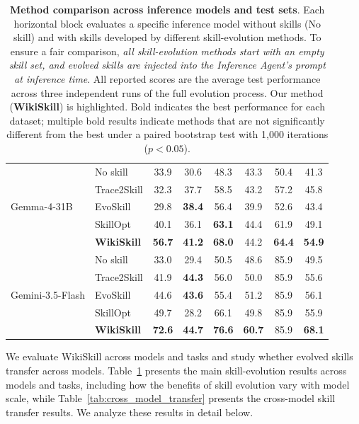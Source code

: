 \documentclass[11pt, a4paper, copyright, gr]{google}
\newcommand{\methodcolor}[1]{\cellcolor[HTML]{FDE293}#1}
\newcommand{\method}{WikiSkill\xspace}
\begin{document}
\begin{table}[t]
\begin{tabular}{llccccc|c}
\midrule
\multirow{5}{*}{Gemma-4-31B} & No skill & 33.9 & 30.6 & 48.3 & 43.3 & 50.4 & 41.3 \\
 & Trace2Skill & 32.3 & 37.7 & 58.5 & 43.2 & 57.2 & 45.8 \\
 & EvoSkill & 29.8 & \textbf{38.4} & 56.4 & 39.9 & 52.6 & 43.4 \\
 & SkillOpt & 40.1 & 36.1 & \textbf{63.1} & 44.4 & 61.9 & 49.1 \\
 & \methodcolor{\textbf{WikiSkill}} & \methodcolor{\textbf{56.7}} & \methodcolor{\textbf{41.2}} & \methodcolor{\textbf{68.0}} & \methodcolor{44.2} & \methodcolor{\textbf{64.4}} & \methodcolor{\textbf{54.9}} \\
\midrule
\multirow{5}{*}{Gemini-3.5-Flash} & No skill & 33.0 & 29.4 & 50.5 & 48.6 & 85.9 & 49.5 \\
 & Trace2Skill & 41.9 & \textbf{44.3} & 56.0 & 50.0 & 85.9 & 55.6 \\
 & EvoSkill & 44.6 & \textbf{43.6} & 55.4 & 51.2 & 85.9 & 56.1 \\
 & SkillOpt & 49.7 & 28.2 & 66.1 & 49.8 & 85.9 & 55.9 \\
 & \methodcolor{\textbf{WikiSkill}} & \methodcolor{\textbf{72.6}} & \methodcolor{\textbf{44.7}} & \methodcolor{\textbf{76.6}} & \methodcolor{\textbf{60.7}} & \methodcolor{85.9} & \methodcolor{\textbf{68.1}} \\
\bottomrule
\end{tabular}
\caption{\textbf{Method comparison across inference models and test sets}. Each horizontal block evaluates a specific inference model without skills (No skill) and with skills developed by different skill-evolution methods. To ensure a fair comparison, \emph{all skill-evolution methods start with an empty skill set, and evolved skills are injected into the Inference Agent's prompt at inference time}. All reported scores are the average test performance across three independent runs of the full evolution process. Our method (\textbf{WikiSkill}) is highlighted. Bold indicates the best performance for each dataset; multiple bold results indicate methods that are not significantly different from the best under a paired bootstrap test with 1,000 iterations ($p < 0.05$).
}
\label{tab:main_results}
\vspace{-5pt}
\end{table}


We evaluate \method across models and tasks and study whether evolved skills transfer across models. Table~\ref{tab:main_results} presents the main skill-evolution results across models and tasks, including how the benefits of skill evolution vary with model scale, while Table~\ref{tab:cross_model_transfer} presents the cross-model skill transfer results. We analyze these results in detail below.
\end{document}
